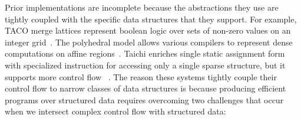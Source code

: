 %
Prior implementations are incomplete because the abstractions they use are tightly coupled with the specific data structures that they support.
%
For example, TACO merge lattices represent boolean logic over sets of non-zero values on an integer grid~\cite{kjolstad_tensor_2017}.
%
The polyhedral model allows various compilers to represent dense computations on affine regions~\cite{grosser2012polly}.
%
Taichi enriches single static assignment form with specialized instruction for accessing only a single sparse structure, but it supports more control flow ~\cite{hu_taichi_2019}.
The reason these systems tightly couple their control flow to narrow classes of data structures is because producing efficient programs over structured data requires overcoming two challenges that occur when we intersect complex control flow with structured data:
%
%
%
%
%




